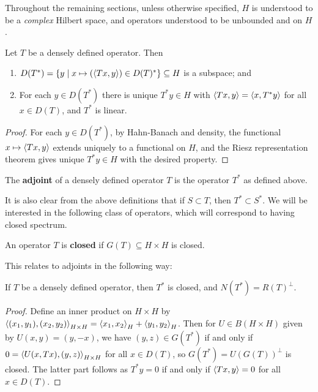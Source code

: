 \documentclass[10pt]{amsart}
\begin{document}
Throughout the remaining sections, unless otherwise specified, $H$ is understood to be a \emph{complex} Hilbert space, and operators understood to be unbounded and on $H$. %
\begin{lemma}
    Let $T$ be a densely defined operator. Then
    \begin{enumerate}
        \item $D(T^*) = \left\{  y \mid x \mapsto (\left\langle Tx, y \right\rangle) \in D(T)^*  \right\} \subseteq H$ is a subspace; and
        \item For each $y \in D(T^*)$ there is unique $T^*y \in H$ with $\left\langle Tx, y \right\rangle = \left\langle x, T^*y \right\rangle$ for all $x \in D(T)$, and $T^*$ is linear.
    \end{enumerate}
\end{lemma}
\begin{proof}
    For each $y \in D(T^*)$, by Hahn-Banach and density, the functional $x \mapsto \left\langle Tx, y \right\rangle$ extends uniquely to a functional on $H$, and the Riesz representation theorem gives unique $T^*y \in H$ with the desired property.
\end{proof}
\begin{definition}[Adjoint]
    The \textbf{adjoint} of a densely defined operator $T$ is the operator $T^*$ as defined above. 
\end{definition}
It is also clear from the above definitions that if $S \subset T$, then $T^* \subset S^*$. We will be interested in the following class of operators, which will correspond to having closed spectrum.
\begin{definition}
    An operator $T$ is \textbf{closed} if $G(T) \subseteq H \times H$ is closed.
\end{definition}
This relates to adjoints in the following way:
\begin{proposition}\label{adjclosed}
    If $T$ be a densely defined operator, then $T^*$ is closed, and $N(T^*) = R(T)^\perp$.
\end{proposition}
\begin{proof}
    Define an inner product on $H \times H$ by $\left\langle (x_1, y_1), (x_2, y_2) \right\rangle_{H \times H} = \left\langle x_1, x_2 \right\rangle_H + \left\langle y_1, y_2 \right\rangle_H$. Then for $U \in B(H \times H)$ given by $U(x, y) = (y, -x)$, we have $(y, z) \in G(T^*)$ if and only if $0 = \left\langle U(x, Tx), (y, z) \right\rangle_{H \times H}$ for all $x \in D(T)$, so $G(T^*) = U(G(T))^\perp$ is closed. The latter part follows as $T^*y = 0$ if and only if $\left\langle Tx, y \right\rangle = 0$ for all $x \in D(T)$.
\end{proof}
\end{document}
